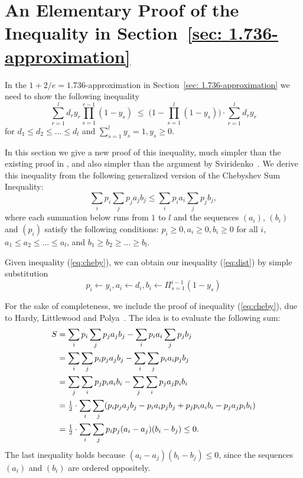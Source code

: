 \documentclass{llncs}
\begin{document}
\section{An Elementary Proof of the Inequality in Section~\ref{sec:
    1.736-approximation}}
In the $1+2/e=1.736$-approximation in Section~\ref{sec: 1.736-approximation}
we need to show the following inequality
%
\begin{equation}
  \label{eq:dist}
\sum_{r=1}^l d_ry_r\prod_{s=1}^{r-1}(1-y_s)
  \;\leq\;  \Big(1 - \prod_{s=1}^l (1-y_s)\Big) \cdot \sum_{r=1}^l d_r y_r
\end{equation}
%
for $d_1\leq d_2 \leq \ldots \leq d_l$ and $\sum_{s=1}^l y_s = 1, y_s \geq 0$.

In this section we give a new proof of this inequality, much
simpler than the existing proof in \cite{ChudakS04}, and also simpler than
the argument by Sviridenko~\cite{Svi02}.  
We derive this inequality from the following generalized version of the Chebyshev Sum
Inequality:
%
\begin{equation}
  \label{eq:cheby}
  \sum_{i} p_i \sum_j p_j a_j b_j \leq \sum_i p_i a_i \sum_j p_j b_j,
\end{equation}
%
where each summation below runs from $1$ to $l$ and the sequences 
$(a_i)$, $(b_i)$ and $(p_i)$ satisfy the following conditions:
$p_i\geq 0, a_i \geq 0, b_i \geq 0$ for all $i$, $a_1\leq a_2 \leq
\ldots \leq a_l$, and $b_1 \geq b_2 \geq \ldots \geq b_l$.

Given inequality (\ref{eq:cheby}), we can obtain our inequality
(\ref{eq:dist}) by simple substitution
%
\begin{equation*}
  p_i \leftarrow y_i, a_i \leftarrow d_i, b_i \leftarrow
  \Pi_{s=1}^{i-1} (1-y_s)
\end{equation*}

For the sake of completeness, we include the proof of inequality (\ref{eq:cheby}), 
due to Hardy, Littlewood and Polya~\cite{HardyLP88}. The idea is to evaluate the 
following sum:
%
\begin{align*}
  S &= \sum_i p_i \sum_j p_j a_j b_j - \sum_i p_i a_i \sum_j p_j b_j
	\\
  & = \sum_i \sum_j p_i p_j a_j b_j - \sum_i \sum_j p_i a_i p_j b_j
	\\
  & = \sum_j \sum_i p_j p_i a_i b_i - \sum_j \sum _i p_j a_j p_i b_i
	\\
	&= {\mbox{$\frac{1}{2}$}} \cdot \sum_i \sum_j (p_i p_j a_j b_j - p_i a_i p_j b_j + p_j p_i a_i
  							b_i - p_j a_j p_i b_i)
\\
  &= {\mbox{$\frac{1}{2}$}} \cdot \sum_i \sum_j p_i p_j (a_i - a_j)(b_i - b_j) \leq 0.
\end{align*}
The last inequality holds because $(a_i-a_j)(b_i-b_j) \leq 0$, since the sequences
$(a_i)$ and $(b_i)$ are ordered oppositely.
\end{document}
